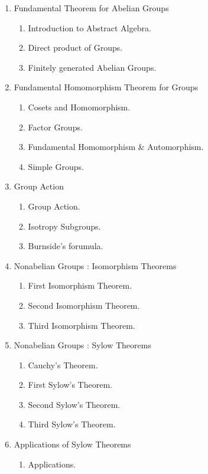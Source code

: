 \begin{enumerate}[label=Topic \arabic*]
	\item Fundamental Theorem for Abelian Groups
	\begin{enumerate}[label=Session \arabic*]
		\item Introduction to Abstract Algebra.
		\item Direct product of Groups.
		\item Finitely generated Abelian Groups.
	\end{enumerate}
	\item Fundamental Homomorphism Theorem for Groups
	\begin{enumerate}[label=Session \arabic*]
		\item Cosets and Homomorphism.
		\item Factor Groups.
		\item Fundamental Homomorphism \& Automorphism.
		\item Simple Groups.
	\end{enumerate}
	\item Group Action
	\begin{enumerate}[label=Session \arabic*]
		\item Group Action.
		\item Isotropy Subgroups.
		\item Burnside's forumula.
	\end{enumerate}
	\item Nonabelian Groups : Isomorphism Theorems
	\begin{enumerate}[label=Session \arabic*]
		\item First Isomorphism Theorem.
		\item Second Isomorphism Theorem.
		\item Third Isomorphism Theorem.
	\end{enumerate}
	\item Nonabelian Groups : Sylow Theorems
	\begin{enumerate}[label=Session \arabic*]
		\item Cauchy's Theorem.
		\item First Sylow's Theorem.
		\item Second Sylow's Theorem.
		\item Third Sylow's Theorem.
	\end{enumerate}
	\item Applications of Sylow Theorems
	\begin{enumerate}[label=Session \arabic*]
		\item Applications.

\end{enumerate}
\end{enumerate}
